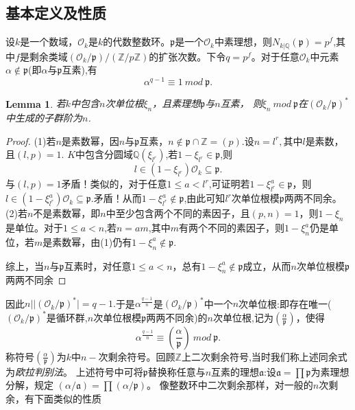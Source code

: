 \documentclass[UTF8]{article}
\newtheorem{lem}{Lemma}[section]
\begin{document}
\subsection{基本定义及性质}
设$k$是一个数域，$\mathcal{O}_{k}$是$k$的代数整数环。$\mathfrak{p}$是一个$\mathcal{O}_{k}$中素理想，则$N_{k|\mathbb{Q}}(\mathfrak{p})=p^{f}$,其中$f$是剩余类域$(\mathcal{O}_{k}/\mathfrak{p})/(\mathbb{Z}/p\mathbb{Z})$的扩张次数。下令$q=p^{f}$。对于任意$\mathcal{O}_{k}$中元素$\alpha\notin \mathfrak{p}$(即$\alpha$与$\mathfrak{p}$互素),有
$$
\alpha^{q-1}\equiv 1\ mod \ \mathfrak{p}.
$$
\begin{lem}
若$k$中包含$n$次单位根$\xi_{n}$，且素理想$\mathfrak{p}$与$n$互素，
则$\xi_{n}\ mod \ \mathfrak{p}$在$(\mathcal{O}_{k}/\mathfrak{p})^{*}$中生成的子群阶为$n$.
\end{lem}
\begin{proof}
(1)若$n$是素数幂，因$n$与$\mathfrak{p}$互素，$n\notin \mathfrak{p}\cap \mathbb{Z}=(p)$.设$n=l^{r},$其中$l$是素数，且$(l,p)=1.$ $K$中包含分圆域$\mathbb{Q}(\xi_{l^{r}})$,若$1-\xi_{l^{r}}\in \mathfrak{p}$,则
$$
l\in (1-\xi_{l^{r}})\mathcal{O}_{k}\subseteq \mathfrak{p}.
$$
与$(l,p)=1$矛盾！类似的，对于任意$1\leq a<l^{r}$,可证明若$1-\xi_{l^{r}}^{a}\in \mathfrak{p}$，则$
l\in (1-\xi_{l^{r}}^{a})\mathcal{O}_{k}\subseteq \mathfrak{p}.$矛盾！从而$1-\xi_{l^{r}}^{a}\notin \mathfrak{p}$,由此可知$l^{r}$次单位根模$\mathfrak{p}$两两不同余。
(2)若$n$不是素数幂，即$n$中至少包含两个不同的素因子，且$(p,n)=1$，则$1-\xi_{n}$是单位。对于$1\leq a<n$,若$n=am$,其中$m$有两个不同的素因子，则$1-\xi_{n}^{a}$仍是单位，若$m$是素数幂，由(1)仍有$1-\xi_{n}^{a}\notin \mathfrak{p}.$

综上，当$n$与$\mathfrak{p}$互素时，对任意$1\leq a<n$，总有$1-\xi_{n}^{a}\notin \mathfrak{p}$成立，从而$n$次单位根模$\mathfrak{p}$两两不同余
\end{proof}
因此$n| |(\mathcal{O}_{k}/\mathfrak{p})^{*}|=q-1.$于是$\alpha^{\frac{q-1}{n}}$是$(\mathcal{O}_{k}/\mathfrak{p})^{*}$中一个$n$次单位根:即存在唯一($(\mathcal{O}_{k}/\mathfrak{p})^{*}$是循环群,$n$次单位根模$\mathfrak{p}$两两不同余)的$n$次单位根,记为$(\frac{\alpha}{\mathfrak{p}})$，使得$$
\alpha^{\frac{q-1}{n}}\equiv \left(\frac{\alpha}{\mathfrak{p}}\right)\ mod \ \mathfrak{p}.
$$
称符号$(\frac{\alpha}{\mathfrak{p}})$为$k$中$n-$次剩余符号。回顾$\mathbb{Z}$上二次剩余符号,当时我们称上述同余式为\emph{欧拉判别法}。
上述符号中可将$\mathfrak{p}$替换称任意与$n$互素的理想$\mathfrak{a}$:设$\mathfrak{a}=\prod{\mathfrak{p}}$为素理想分解，规定
$(\alpha/\mathfrak{a})=\prod(\alpha/\mathfrak{p})$。
像整数环中二次剩余那样，对一般的$n$次剩余，有下面类似的性质
\end{document}
